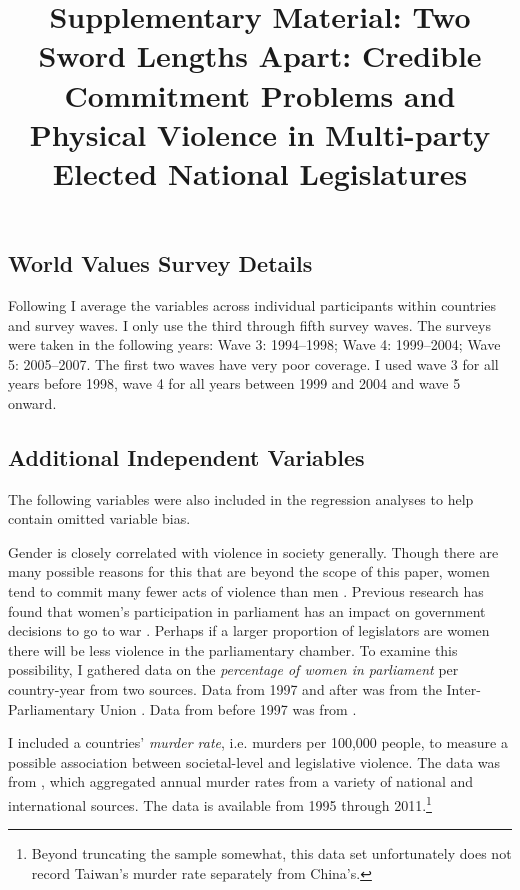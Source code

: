 \documentclass[a4paper]{article}\usepackage[]{graphicx}\usepackage[]{color}
\title{Supplementary Material: Two Sword Lengths Apart: Credible Commitment Problems and Physical Violence in Multi-party Elected National Legislatures}
\date{}
\begin{document}
\maketitle





\subsection*{World Values Survey Details}

Following \cite{Inglehart2003} I average the variables across individual participants within countries and survey waves. I only use the third through fifth survey waves. The surveys were taken in the following years: Wave 3: 1994--1998; Wave 4: 1999--2004; Wave 5: 2005--2007. The first two waves have very poor coverage. I used wave 3 for all years before 1998, wave 4 for all years between 1999 and 2004 and wave 5 onward.

\subsection*{Additional Independent Variables}

The following variables were also included in the regression analyses to help contain omitted variable bias.

Gender is closely correlated with violence in society generally. Though there are many possible reasons for this that are beyond the scope of this paper, women tend to commit many fewer acts of violence than men \citep[see][]{Schwartz2009}. Previous research has found that women's participation in parliament has an impact on government decisions to go to war \citep{Melander2005}. Perhaps if a larger proportion of legislators are women there will be less violence in the parliamentary chamber. To examine this possibility, I gathered data on the \emph{percentage of women in parliament} per country-year from two sources. Data from 1997 and after was from the Inter-Parliamentary Union \citeyearpar{IPU2013}. Data from before 1997 was from \cite{Schwartz2009}.

I included a countries' \emph{murder rate}, i.e. murders per 100,000 people, to measure a possible association between societal-level and legislative violence. The data was from \cite{UNMurder2013}, which aggregated annual murder rates from a variety of national and international sources. The data is available from 1995 through 2011.\footnote{Beyond truncating the sample somewhat, this data set unfortunately does not record Taiwan's murder rate separately from China's.}
\end{document}

